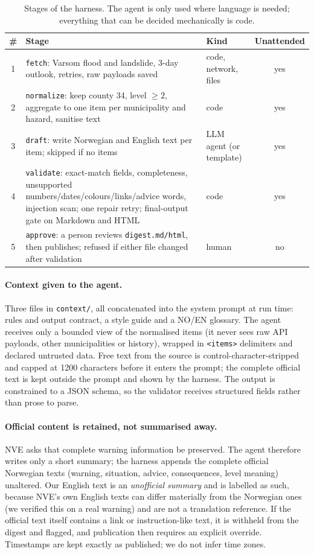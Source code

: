 \documentclass{article}
\begin{document}
\begin{table}[h]
  \caption{Stages of the harness. The agent is only used where language is needed; everything that can be decided mechanically is code.}
  \label{tab:stages}
  \centering\small
  \begin{tabular}{@{}cp{6.3cm}p{2.6cm}c@{}}
    \toprule
    \# & Stage & Kind & Unattended \\
    \midrule
    1 & \texttt{fetch}: Varsom flood and landslide, 3-day outlook, retries, raw payloads saved & code, network, files & yes \\
    2 & \texttt{normalize}: keep county 34, level $\geq 2$, aggregate to one item per municipality and hazard, sanitise text & code & yes \\
    3 & \texttt{draft}: write Norwegian and English text per item; skipped if no items & LLM agent (or template) & yes \\
    4 & \texttt{validate}: exact-match fields, completeness, unsupported numbers/dates/colours/links/advice words, injection scan; one repair retry; final-output gate on Markdown and HTML & code & yes \\
    5 & \texttt{approve}: a person reviews \texttt{digest.md/html}, then publishes; refused if either file changed after validation & human & no \\
    \bottomrule
  \end{tabular}
\end{table}

\paragraph{Context given to the agent.} Three files in \texttt{context/}, all concatenated into the system prompt at run time: rules and output contract, a style guide and a NO/EN glossary. The agent receives only a bounded view of the normalised items (it never sees raw API payloads, other municipalities or history), wrapped in \texttt{<items>} delimiters and declared untrusted data. Free text from the source is control-character-stripped and capped at 1200 characters before it enters the prompt; the complete official text is kept outside the prompt and shown by the harness. The output is constrained to a JSON schema, so the validator receives structured fields rather than prose to parse.

\paragraph{Official content is retained, not summarised away.} NVE asks that complete warning information be preserved. The agent therefore writes only a short summary; the harness appends the complete official Norwegian texts (warning, situation, advice, consequences, level meaning) unaltered. Our English text is an \emph{unofficial summary} and is labelled as such, because NVE's own English texts can differ materially from the Norwegian ones (we verified this on a real warning) and are not a translation reference. If the official text itself contains a link or instruction-like text, it is withheld from the digest and flagged, and publication then requires an explicit override. Timestamps are kept exactly as published; we do not infer time zones.
\end{document}
